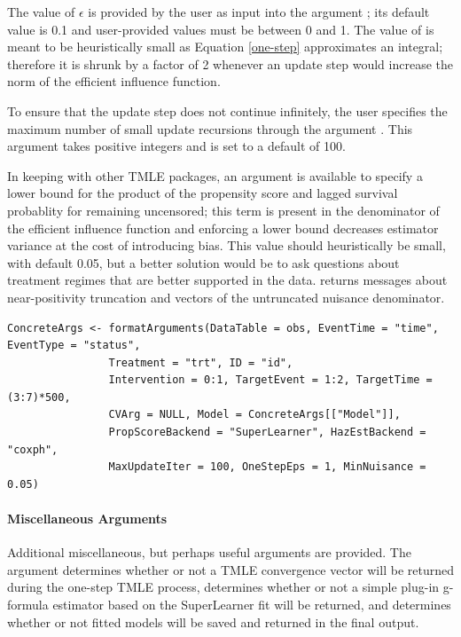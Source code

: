 \documentclass{report}
\newcommand{\1}{\ensuremath{\mathbf{1}}}
\begin{document}
The value of \(\epsilon\) is provided by the user as input into the argument ; its default value is 0.1 and user-provided values must be between 0 and 1. The value of  is meant to be heuristically small as Equation \eqref{one-step} approximates an integral; therefore it is shrunk by a factor of 2 whenever an update step would increase the norm of the efficient influence function.

To ensure that the update step does not continue infinitely, the user specifies the maximum number of small update recursions through the argument . This argument takes positive integers and is set to a default of 100.

In keeping with other TMLE packages, an argument  is available to specify a lower bound for the product of the propensity score and lagged survival probablity for remaining uncensored; this term is present in the denominator of the efficient influence function and enforcing a lower bound decreases estimator variance at the cost of introducing bias. This value should heuristically be small, with default 0.05, but a better solution would be to ask questions about treatment regimes that are better supported in the data.  returns messages about near-positivity truncation and vectors of the untruncated nuisance denominator.

\begin{lstlisting}
ConcreteArgs <- formatArguments(DataTable = obs, EventTime = "time", EventType = "status", 
				Treatment = "trt", ID = "id", 
				Intervention = 0:1, TargetEvent = 1:2, TargetTime = (3:7)*500, 
				CVArg = NULL, Model = ConcreteArgs[["Model"]], 
				PropScoreBackend = "SuperLearner", HazEstBackend = "coxph", 
				MaxUpdateIter = 100, OneStepEps = 1, MinNuisance = 0.05)
\end{lstlisting}

\paragraph{Miscellaneous Arguments}
\label{misc-args}
Additional miscellaneous, but perhaps useful arguments are provided. The argument  determines whether or not a TMLE convergence vector will be returned during the one-step TMLE process,  determines whether or not a simple plug-in g-formula estimator based on the SuperLearner fit will be returned, and  determines whether or not fitted models will be saved and returned in the final output.
\end{document}
